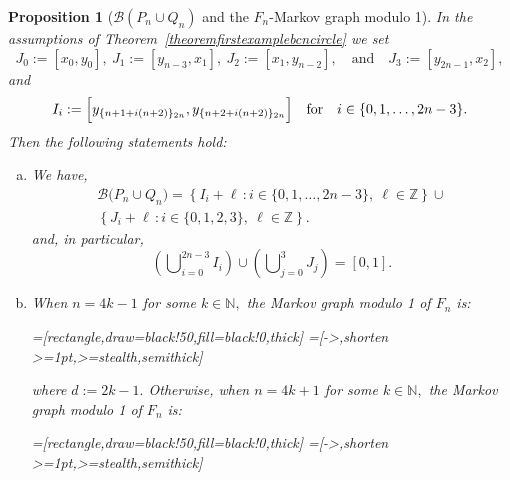 \documentclass[a4paper, 11pt]{amsart}
\numberwithin{equation}{section}
\newtheorem{proposition}[theorem]{Proposition}
\theoremstyle{customnumberedtheorem}
\theoremstyle{definitionwithbfnote}
\newcommand{\N}{\ensuremath{\mathbb{N}}}
\newcommand{\Z}{\ensuremath{\mathbb{Z}}}
\newcommand{\set}[2]{\ensuremath{\left\{#1 \,\colon #2\right\}}}
\newcommand{\bigBIclass}[1]{\ensuremath{\bigl\llbracket #1\bigr\rrbracket}}
\def\calB{\mathcal{B}}
\newcommand{\bigSBI}[1]{\ensuremath{\calB\bigl(#1\bigr)}}
\newcommand{\andq}[1][and]{\ensuremath{\quad\text{#1}\quad}}
\newcommand{\modulo}[2]{\{#1\}\sb{#2}}
\begin{document}
\begin{proposition}[$\calB(P_n \cup Q_n)$ and the $F_n$-Markov graph modulo 1]\label{propositionmarkovgraphfirstexamplebcn}
In the assumptions of Theorem~\ref{theoremfirstexamplebcncircle} we set
\[
  J_0 := [ x_0, y_0],\ J_1 := [ y_{n-3}, x_1],\ J_2 := [ x_1, y_{n-2}], \andq J_3 := [ y_{2n-1}, x_2],
\]
and
\[
  I_i := \Bigl[y_{\modulo{n+1+i(n+2)}{2n}}, y_{\modulo{n+2+i(n+2)}{2n}}\Bigr] \andq[for] i \in \{0,1,\dots,2n-3\}.
\]
Then the following statements hold:
\begin{enumerate}[(a)]
\item We have,
\begin{multline*}
 \bigSBI{P_n \cup Q_n} = \set{I_i + \ell}{i \in \{0,1,\dots,2n-3\},\ \ell \in \Z} \cup \\
                      \set{J_i + \ell}{i \in \{0,1,2,3\},\ \ell \in \Z}.
\end{multline*}
and, in particular,
\[
   \left(\bigcup\nolimits_{i=0}^{2n-3} I_i  \right)\cup \left(\bigcup\nolimits_{j=0}^{3} J_j \right) = [0,1].
\]
%
\item When $n = 4k-1$ for some $k \in \N,$
the Markov graph modulo 1 of $F_n$ is:
\begin{center}\tiny
        =[rectangle,draw=black!50,fill=black!0,thick]
        =[->,shorten >=1pt,>=stealth,semithick]
\hspace*{-1.8em}\medskip
\end{center}
where $d := 2k-1.$
Otherwise, when $n = 4k+1$ for some $k \in \N,$
the Markov graph modulo 1 of $F_n$ is:\vspace*{-1ex}
\begin{center}\tiny
        =[rectangle,draw=black!50,fill=black!0,thick]
        =[->,shorten >=1pt,>=stealth,semithick]
\smallskip
\hspace*{-1.6em}
\end{center}
\end{enumerate}
\end{proposition}
\end{document}
